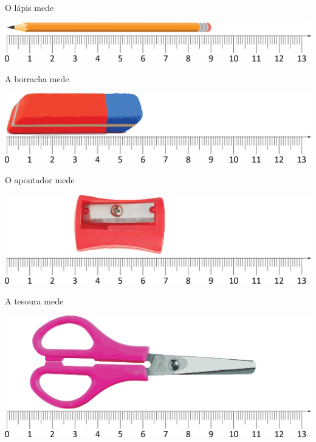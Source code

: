 \begin{escolha}

\item O lápis mede 

\noindent\includegraphics[width=\textwidth]{./media/image42.png}

\item A borracha mede 

\noindent\includegraphics[width=\textwidth]{./media/image43.png}

\pagebreak

\item O apontador mede 

\noindent\includegraphics[width=\textwidth]{./media/image44.png}

\item A tesoura mede 

\noindent\includegraphics[width=\textwidth]{./media/image45.png}
\end{escolha}

